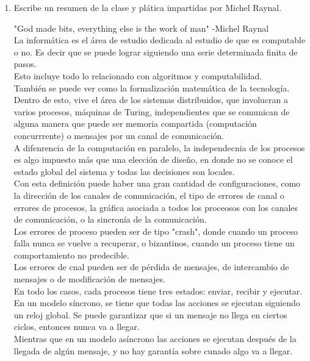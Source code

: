 \documentclass[12pt,a4paper]{report}
\begin{document}
\begin{enumerate}
{\begin{enumerate} [label = \alph*]
{			}
		\end{enumerate}

	}

	\item{
		Escribe un resumen de la clase y plática impartidas por Michel Raynal.

		"God made bits, everything else is the work of man" -Michel Raynal\\
		La informática es el área de estudio dedicada al estudio de que es computable
		o no. Es decir que se puede lograr siguiendo una serie determinada finita de pasos.\\
		Esto incluye todo lo relacionado con algoritmos y computabilidad.\\
		También se puede ver como la formalización matemática de la tecnología.\\
		Dentro de esto, vive el área de los sistemas distribuidos, que involucran
		a varios procesos, máquinas de Turing, independientes que se comunican de
		alguna manera que puede ser memoria compartida (computación concurrrente)
		o mensajes por un canal de comunicación.\\
		A difenrencia de la computación en paralelo, la independecnia de los procesos
		es algo impuesto más que una elección de diseño, en donde no se conoce el
		estado global del sistema y todas las decisiones son locales.\\
		Con esta definición puede haber una gran cantidad de configuraciones, como
		la dirección de los canales de comunicación, el tipo de errores de canal o errores
		de procesos, la gráfica asociada a todos los proceosos con los canales de comunicación,
		o la sincronía de la comunicación.\\
		Los errores de proceso pueden ser de tipo "crash", donde cuando un proceso
		falla nunca se vuelve a recuperar, o bizantinos, cuando un proceso tiene un
		comportamiento no predecible.\\
		Los errores de cnal pueden ser de pérdida de mensajes, de intercambio de mensajes
		o de modificación de mensajes.\\
		En todo los casos, cada procesos tiene tres estados: enviar, recibir y ejecutar.
		En un modelo síncrono, se tiene que todas las acciones se ejecutan siguiendo
		un reloj global. Se puede garantizar que si un mensaje no llega en ciertos ciclos,
		entonces nunca va a llegar.\\
		Mientras que en un modelo asíncrono las acciones se ejecutan después de la llegada
		de algún mensaje, y no hay garantía sobre cunado algo va a llegar.\\
}
\end{enumerate}
\end{document}

